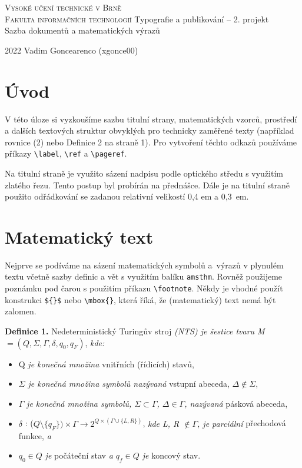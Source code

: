 \documentclass[a4paper, 11pt]{article}
\date{}
\begin{document}

\begin{center}
    \huge
    \textsc{Vysoké učení technické v Brně\\ Fakulta informačních technologií}
    \vfill
    \LARGE
    Typografie a publikování – 2. projekt\\
    Sazba dokumentů a matematických výrazů
    \vfill
        

\end{center}
{\LARGE 2022 \hfill Vadim Goncearenco (xgonce00)}
\twocolumn
\section*{Úvod}
V této úloze si vyzkoušíme sazbu titulní strany, matematických vzorců, prostředí a dalších textových struktur obvyklých pro technicky zaměřené texty (například rovnice (2)
nebo Definice 2 na straně 1). Pro vytvoření těchto odkazů používáme příkazy \verb|\label|, \verb|\ref| a \verb|\pageref|.

Na titulní straně je využito sázení nadpisu podle optického středu s využitím zlatého řezu. Tento postup byl
probírán na přednášce. Dále je na titulní straně použito odřádkování se
zadanou relativní velikostí 0,4 em a 0,3~em.

\section{Matematický text}
Nejprve se podíváme na sázení matematických symbolů
a~výrazů v plynulém textu včetně sazby definic a vět s využitím balíku \texttt{amsthm}. Rovněž použijeme poznámku pod
čarou s použitím příkazu \verb|\footnote|. Někdy je vhodné
použít konstrukci \verb|${}$| nebo \verb|\mbox{}|, která říká, že (matematický) text nemá být
zalomen.
\medskip

\noindent\textbf{Definice 1.} Nedeterministický Turingův stroj \emph{(NTS) je šestice tvaru M} $ = (Q, \Sigma, \Gamma, \delta, q_0, q_F)$, \emph{kde:}
\begin{itemize}
    \item Q \emph{je konečná množina} vnitřních (řídicích) stavů,
    \item $\Sigma$ \emph{je konečná množina symbolů nazývaná} vstupní abeceda, $\Delta \notin \Sigma$,
    \item $\Gamma$ \emph{je konečná množina symbolů, $\Sigma \subset \Gamma$, $\Delta \in \Gamma$, nazývaná} pásková abeceda,
    \item $\delta$ : ($Q \setminus \{q_F\}) \times \Gamma \rightarrow 2^{Q\times(\Gamma \cup\{L,R\})}$, \emph{kde L, R $\notin \Gamma$, je parciální} přechodová funkce, \emph{a}
    \item $q_0 \in Q$ \emph{je} počáteční stav \emph{a $q_f \in Q$ je} koncový stav.
\end{itemize}
\end{document}
